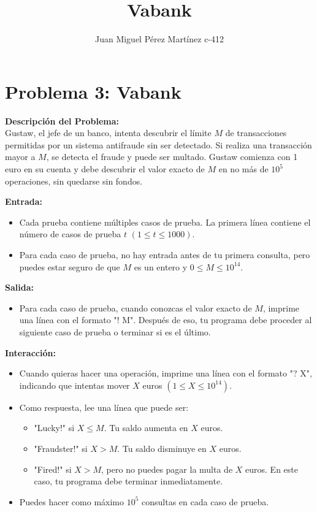 \documentclass{article}
\title{Vabank}
\author{Juan Miguel Pérez Martínez c-412}
\begin{document}
\maketitle

\section*{Problema 3: Vabank}

\textbf{Descripción del Problema:} \\
Gustaw, el jefe de un banco, intenta descubrir el límite \(M\) de transacciones permitidas por un sistema antifraude sin ser detectado. Si realiza una transacción mayor a \(M\), se detecta el fraude y puede ser multado. Gustaw comienza con 1 euro en su cuenta y debe descubrir el valor exacto de \(M\) en no más de \(10^5\) operaciones, sin quedarse sin fondos.

\textbf{Entrada:}
\begin{itemize}
    \item Cada prueba contiene múltiples casos de prueba. La primera línea contiene el número de casos de prueba \(t\) \((1 \leq t \leq 1000)\).
    \item Para cada caso de prueba, no hay entrada antes de tu primera consulta, pero puedes estar seguro de que \(M\) es un entero y \(0 \leq M \leq 10^{14}\).
\end{itemize}

\textbf{Salida:}
\begin{itemize}
    \item Para cada caso de prueba, cuando conozcas el valor exacto de \(M\), imprime una línea con el formato "! M". Después de eso, tu programa debe proceder al siguiente caso de prueba o terminar si es el último.
\end{itemize}

\textbf{Interacción:}
\begin{itemize}
    \item Cuando quieras hacer una operación, imprime una línea con el formato "? X", indicando que intentas mover \(X\) euros \((1 \leq X \leq 10^{14})\). 
    \item Como respuesta, lee una línea que puede ser:
    \begin{itemize}
        \item "Lucky!" si \(X \leq M\). Tu saldo aumenta en \(X\) euros.
        \item "Fraudster!" si \(X > M\). Tu saldo disminuye en \(X\) euros.
        \item "Fired!" si \(X > M\), pero no puedes pagar la multa de \(X\) euros. En este caso, tu programa debe terminar inmediatamente.
    \end{itemize}
    \item Puedes hacer como máximo \(10^5\) consultas en cada caso de prueba.
\end{itemize}
\end{document}
